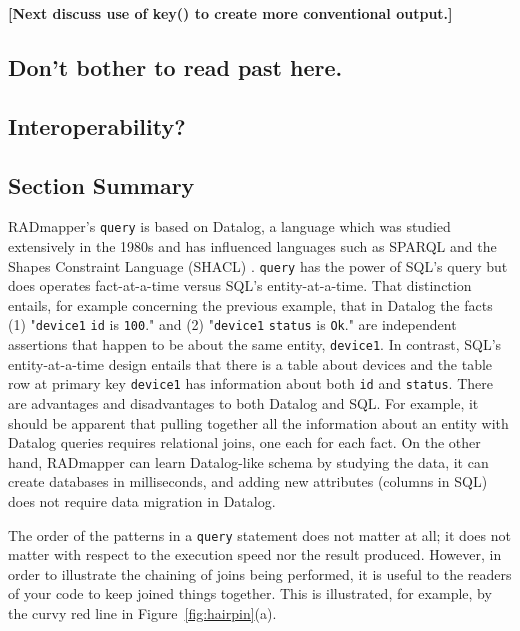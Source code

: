 \documentclass[9pt,letterpaper]{article}
\newcommand{\stt}[1]{\texttt{#1}} %
\begin{document}
\textbf{[Next discuss use of key() to create more conventional output.]}

\subsection{Don't bother to read past here.}

\subsection{Interoperability?}

\subsection{Section Summary}

RADmapper's \stt{query} is based on Datalog, a language which was studied extensively in the 1980s \cite{Abiteboul1995a}
and has influenced languages such as SPARQL and the Shapes Constraint Language (SHACL) \cite{?}.
\stt{query} has the power of SQL's  query but does operates fact-at-a-time versus SQL's entity-at-a-time.
That distinction entails, for example concerning the previous example, that in Datalog the facts (1) "\stt{device1} \stt{id} is \stt{100}." and (2) "\stt{device1} \stt{status} is \stt{Ok}." are independent assertions that happen to be about the same entity, \stt{device1}.
In contrast, SQL's entity-at-a-time design entails that there is a table about devices and the table row at primary key \stt{device1} has information about both \stt{id} and \stt{status}.
There are advantages and disadvantages to both Datalog and SQL.\@
For example, it should be apparent that pulling together all the information about an entity with Datalog queries requires relational joins, one each for each fact.
On the other hand, RADmapper can learn Datalog-like schema by studying the data, it can create databases in milliseconds, and adding new attributes (columns in SQL) does not require data migration in Datalog.

The order of the patterns in a \stt{query} statement does not matter at all; it does not matter with respect to the execution speed nor the result produced.
However, in order to illustrate the chaining of joins being performed, it is useful to the readers of your code to keep joined things together.
This is illustrated, for example, by the curvy red line in Figure~\ref{fig:hairpin}(a).


\end{document}
